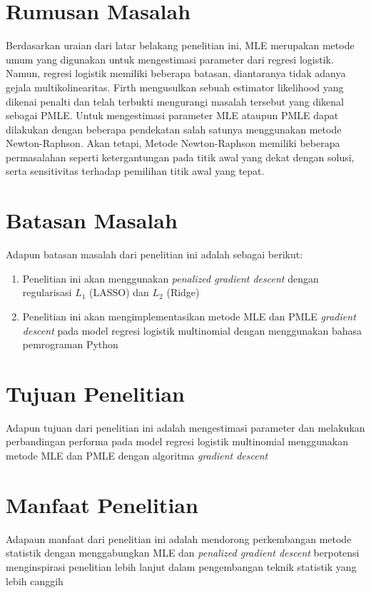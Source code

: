 \section{Rumusan Masalah}
\noindent Berdasarkan uraian dari latar belakang penelitian ini, MLE merupakan metode umum yang digunakan untuk mengestimasi parameter dari regresi logistik. Namun, regresi logistik memiliki beberapa batasan, diantaranya tidak adanya gejala multikolinearitas. Firth \citep*{Firth1993} mengusulkan sebuah estimator likelihood yang dikenai penalti dan telah terbukti mengurangi masalah tersebut yang dikenal sebagai PMLE. Untuk mengestimasi parameter MLE ataupun PMLE dapat dilakukan dengan beberapa pendekatan salah satunya menggunakan metode Newton-Raphson. Akan tetapi, Metode Newton-Raphson memiliki beberapa permasalahan seperti ketergantungan pada titik awal yang dekat dengan solusi, serta sensitivitas terhadap pemilihan titik awal yang tepat.


\section{Batasan Masalah}
\noindent Adapun batasan masalah dari penelitian ini adalah sebagai berikut:
\begin{enumerate}
	\item Penelitian ini akan menggunakan \textit{penalized gradient descent} dengan regularisasi $L_1$ (LASSO) dan $L_2$ (Ridge)
	\item Penelitian ini akan mengimplementasikan metode MLE dan PMLE \textit{gradient descent} pada model regresi logistik multinomial dengan menggunakan bahasa pemrograman Python
\end{enumerate}

\section{Tujuan Penelitian}
\noindent Adapun tujuan dari penelitian ini adalah mengestimasi parameter dan melakukan perbandingan performa pada model regresi logistik multinomial menggunakan metode MLE dan PMLE dengan algoritma \textit{gradient descent}

\section{Manfaat Penelitian}
\noindent Adapaun manfaat dari penelitian ini adalah mendorong perkembangan metode statistik dengan menggabungkan MLE dan \textit{penalized gradient descent} berpotensi menginspirasi penelitian lebih lanjut dalam pengembangan teknik statistik yang lebih canggih